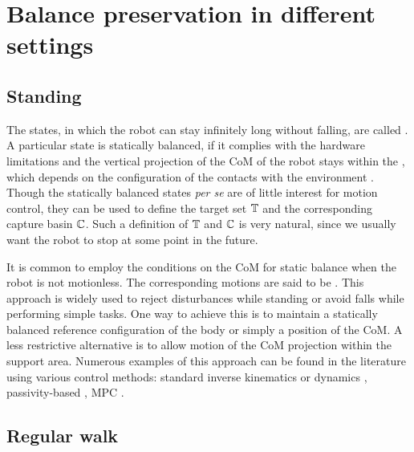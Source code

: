 \section{Balance preservation in different settings}

\subsection{Standing}
The states, in which the robot can stay infinitely long without falling, are
called . A particular state is statically balanced, if
it complies with the hardware limitations and the vertical projection of the
\ac{CoM} of the robot stays within the , which depends on the
configuration of the contacts with the environment \cite{Wieber2002stability,
Bretl2008tranrob, Santos2005auro}. Though the statically balanced states
\emph{per se} are of little interest for motion control, they can be used to
define the target set $\mathbb{T}$ and the corresponding capture basin $\mathbb{C}$.
Such a definition of $\mathbb{T}$ and $\mathbb{C}$ is very natural, since we usually
want the robot to stop at some point in the future.


It is common to employ the conditions on the \ac{CoM} for static balance when
the robot is not motionless. The corresponding motions are said to be
. This approach is widely used to reject
disturbances while standing or avoid falls while performing simple tasks. One
way to achieve this is to maintain a statically balanced reference
configuration of the body or simply a position of the \ac{CoM}. A less
restrictive alternative is to allow motion of the \ac{CoM} projection within
the support area. Numerous examples of this approach can be found in the
literature using various control methods: standard inverse kinematics
\cite{Escande2014ijrr} or dynamics \cite{Collette2007humanoids},
passivity-based \cite{Hyon2007tro, Ott2011humanoids}, \ac{MPC}
\cite{Henze2014iros}.



\subsection{Regular walk}\label{sec.regular_walk}

